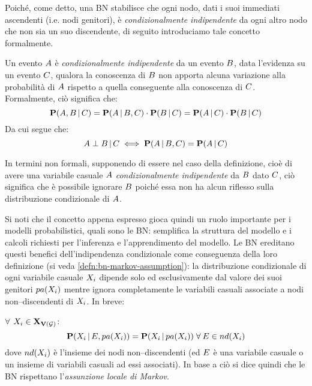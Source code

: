 Poiché, come detto, una \acl{BN} stabilisce che ogni nodo, dati i suoi immediati ascendenti (i.e. nodi genitori), è \emph{condizionalmente indipendente} da ogni altro nodo che non sia un suo discendente, di seguito introduciamo tale concetto formalmente.
\begin{definizione}\label{defn:ic}
Un evento $\mathnormal{A}$ è \emph{condizionalmente indipendente} da un evento $\mathnormal{B}$, data l'evidenza su un evento $\mathnormal{C}$, qualora la conoscenza di $\mathnormal{B}$ non apporta alcuna variazione alla probabilità di $\mathnormal{A}$ rispetto a quella conseguente alla conoscenza di $\mathnormal{C}$.
Formalmente, ciò significa che:
\[
\mathbf{P}(\mathnormal{A},\mathnormal{B}\,\arrowvert\,\mathnormal{C})=\mathbf{P}(\mathnormal{A}\,\arrowvert\,\mathnormal{B},\mathnormal{C})\cdot\mathbf{P}(\mathnormal{B}\,\arrowvert\,\mathnormal{C})=\mathbf{P}(\mathnormal{A}\,\arrowvert\,\mathnormal{C})\cdot\mathbf{P}(\mathnormal{B}\,\arrowvert\,\mathnormal{C})
\]
Da cui segue che:
\[
\mathnormal{A}\perp\mathnormal{B}\,\arrowvert\,\mathnormal{C}\iff\mathbf{P}(\mathnormal{A}\,\arrowvert\,\mathnormal{B},\mathnormal{C})=\mathbf{P}(\mathnormal{A}\,\arrowvert\,\mathnormal{C})
\]
\end{definizione}
In termini non formali, supponendo di essere nel caso della definizione, cioè di avere una variabile casuale $\mathnormal{A}$ \emph{condizionalmente indipendente} da $\mathnormal{B}$ dato $\mathnormal{C}$, ciò significa che è possibile ignorare $\mathnormal{B}$ poiché essa non ha alcun riflesso sulla distribuzione condizionale di $\mathnormal{A}$.

Si noti che il concetto appena espresso gioca quindi un ruolo importante per i modelli probabilistici, quali sono le \acl{BN}: semplifica la struttura del modello e i calcoli richiesti per l'inferenza e l'apprendimento del modello. Le \acl{BN} ereditano questi benefici dell'indipendenza condizionale come conseguenza della loro definizione (si veda \ref{defn:bn-markov-assumption}): la distribuzione condizionale di ogni variabile casuale $\mathnormal{X_i}$ dipende solo ed esclusivamente dal valore dei suoi genitori $pa(\mathnormal{X_i})$ mentre ignora completamente le variabili casuali associate a nodi non--discendenti di $\mathnormal{X_i}$. In breve:

$\forall$ $\mathnormal{X_i}\in\mathbf{X}_{\mathbf{V}(\mathcal{G})}$:
\[
\mathbf{P}(\mathnormal{X_i}\,\arrowvert\,\mathnormal{E},pa(\mathnormal{X_i}))=\mathbf{P}(\mathnormal{X_i}\,\arrowvert\,pa(\mathnormal{X_i}))\;\forall\:\mathnormal{E}\in nd(\mathnormal{X_i})
\]
dove $nd(\mathnormal{X_i})$ è l'insieme dei nodi non--discendenti (ed $\mathnormal{E}$ è una variabile casuale o un insieme di variabili casuali ad essi associati).
In base a ciò si dice quindi che le \acl{BN} rispettano l'\emph{assunzione locale di Markov}.

